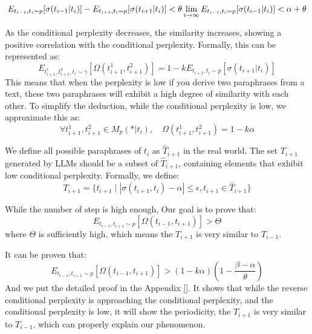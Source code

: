 \[ E_{t_{i-1},t_{i} \sim p}[\sigma(t_{i-1}|t_{i})] - E_{t_{i+1},t_{i} \sim p}[\sigma(t_{i+1}|t_{i})]<\theta \\\lim_{i\to \infty} E_{t_{i-1},t_{i} \sim p}[\sigma(t_{i-1}|t_{i})]  < \alpha+\theta \]

As the conditional perplexity decreases, the similarity increases, showing a positive correlation with the conditional perplexity. Formally, this can be represented as:
\[
E_{t^1_{i+1}, t^2_{i+1}, t_i \sim \gamma}[\Omega(t^1_{i+1}, t^2_{i+1})] = 1 - kE_{t_{i+1}, t_{i} \sim p}[\sigma(t_{i+1}|t_{i})]
\]
This means that when the perplexity is low if you derive two paraphrases from a text, these two paraphrases will exhibit a high degree of similarity with each other. 
To simplify the deduction, while the conditional perplexity is low, we approximate this as:
\[ \forall t_{i+1}^1,t_{i+1}^2 \in M_p(*|t_{i}),\quad  \Omega(t^1_{i+1},t^2_{i+1})=1-k\alpha\]

We define all possible paraphrases of \(t_i\) as \(\hat{T}_{i+1}\) in the real world. The set \(T_{i+1}\) generated by LLMs should be a subset of \(\hat{T}_{i+1}\), containing elements that exhibit low conditional perplexity. Formally, we define:
\[
T_{i+1} = \{t_{i+1} \mid |\sigma(t_{i+1}, t_i) - \alpha| \le \epsilon, t_{i+1} \in \hat{T}_{i+1}\}
\]

While the number of step is high enough, Our goal is to prove that:
\[E_{t_{i-1}, t_{i+1} \sim p}[\Omega(t_{i-1}, t_{i+1})] > \Theta\]
where \(\Theta\) is sufficiently high, which means the \(T_{i+1}\) is very similar to \(T_{i-1}\).

It can be proven that:
\[E_{t_{i-1},t_{i+1} \sim p}[\Omega(t_{i-1},t_{i+1})] > (1-k\alpha)(1-\frac{\beta-\alpha}{\theta})\]
And we put the detailed proof in the Appendix \ref{}. It shows that while the reverse conditional perplexity is approaching the conditional perplexity, and the conditional perplexity is low, it will show the periodicity, the \(T_{i+1}\) is very similar to \(T_{i-1}\), which can properly explain our phenomenon.



